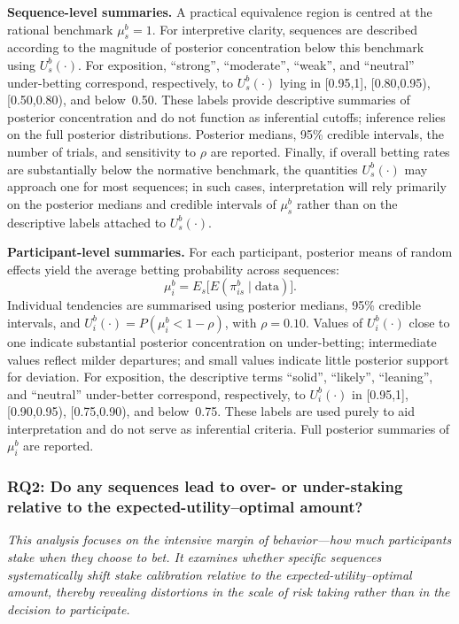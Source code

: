 \documentclass[11pt,a4paper]{article}
\numberwithin{equation}{section}
\begin{document}
\textbf{Sequence-level summaries.}
A practical equivalence region is centred at the rational benchmark 
$\mu_s^{b} = 1$. For interpretive clarity, sequences are described according to 
the magnitude of posterior concentration below this benchmark using $U^{b}_s(\cdot)$. 
For exposition, \enquote{strong}, \enquote{moderate}, \enquote{weak}, and 
\enquote{neutral} under-betting correspond, respectively, to $U^{b}_s(\cdot)$ lying in 
[0.95,1], [0.80,0.95), [0.50,0.80), and below~0.50. These labels provide 
descriptive summaries of posterior concentration and do not function as inferential 
cutoffs; inference relies on the full posterior distributions. Posterior medians, 
95\% credible intervals, the number of trials, and sensitivity to $\rho$ are 
reported. Finally, if overall betting rates are substantially below the
normative benchmark, the quantities $U^{b}_s(\cdot)$ may approach one for most
sequences; in such cases, interpretation will rely primarily on the posterior
medians and credible intervals of $\mu_s^{b}$ rather than on the descriptive
labels attached to $U^{b}_s(\cdot)$.

\textbf{Participant-level summaries.}
For each participant, posterior means of random effects yield the average betting 
probability across sequences:
\[
\mu_i^{b} = E_s\!\big[E(\pi_{is}^{b} \mid \text{data})\big].
\]
Individual tendencies are summarised using posterior medians, 95\% credible 
intervals, and $U^{b}_i(\cdot) = P(\mu_i^{b} < 1 - \rho)$, with $\rho = 0.10$. Values 
of $U^{b}_i(\cdot)$ close to one indicate substantial posterior concentration on 
under-betting; intermediate values reflect milder departures; and small values 
indicate little posterior support for deviation. For exposition, the descriptive 
terms \enquote{solid}, \enquote{likely}, \enquote{leaning}, and \enquote{neutral} 
under-better correspond, respectively, to $U^{b}_i(\cdot)$ in [0.95,1], [0.90,0.95), 
[0.75,0.90), and below~0.75. These labels are used purely to aid interpretation 
and do not serve as inferential criteria. Full posterior summaries of $\mu_i^{b}$ 
are reported.



\subsubsection{RQ2: Do any sequences lead to over- or under-staking relative to the expected-utility--optimal amount?}
\label{Sec:Rq2}

\textit{This analysis focuses on the intensive margin of behavior---how much participants stake when they choose to bet. 
	It examines whether specific sequences systematically shift stake calibration relative to the expected-utility--optimal amount, 
	thereby revealing distortions in the scale of risk taking rather than in the decision to participate.}
\end{document}

